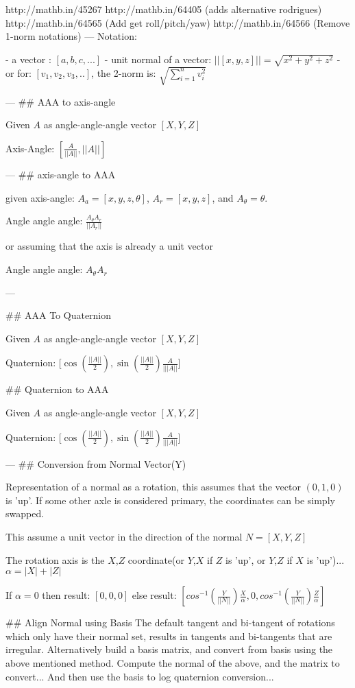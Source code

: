 http://mathb.in/45267
http://mathb.in/64405 (adds alternative rodrigues)
http://mathb.in/64565 (Add get roll/pitch/yaw)
http://mathb.in/64566 (Remove 1-norm notations)
---
Notation:
 
 - a vector : $[a,b,c,...]$
 - unit normal of a vector: $ ||[x,y,z]|| = \sqrt { x^2+y^2+z^2 } $
   - or for: $ [v_1,v_2,v_3,..] $, the 2-norm is: $ \sqrt { \sum_{i=1}^n v_i^2 } $

---
## AAA to axis-angle

Given $A$ as angle-angle-angle vector $[{X},{Y} ,{Z}] $ 

Axis-Angle: $ [ \frac {A} {||A||}, ||{A}|| ] $

---
## axis-angle to AAA

given axis-angle:
$ A_a =[ {x},{y},{z},{{\theta}}]  $, $A_r=[x,y,z]$, and $A_\theta = \theta$.

Angle angle angle: $   \frac  {{A_\theta}A_r} {||A_r||} $

or assuming that the axis is already a unit vector

Angle angle angle: $   {{A_\theta}A_r}$

---


## AAA To Quaternion

Given $A$ as angle-angle-angle vector $[{X},{Y} ,{Z}]$

Quaternion: [$\cos(\frac {||A||} {2} ),  \sin ( \frac {||A||} {2} ) \frac A {|||A||} $]


## Quaternion to AAA

Given $A$ as angle-angle-angle vector $[{X},{Y} ,{Z}]$

Quaternion: [$\cos(\frac {||A||} {2} ),  \sin ( \frac {||A||} {2} ) \frac A {|||A||} $]


---
## Conversion from Normal Vector(Y)

Representation of a normal as a rotation, this assumes that the vector $(0,1,0)$ is 'up'.  If some other axle is considered primary, the coordinates can be simply swapped.

This assume a unit vector in the direction of the normal
$N = [ X, Y, Z ]$


The rotation axis is the $X$,$Z$ coordinate(or $Y$,$X$ if $Z$ is 'up', or $Y$,$Z$ if $X$ is 'up')...
$   \alpha = |X| + |Z|$

If $\alpha = 0$ then result: $[0,0,0]$
else result: $ [      cos^{-1}( \frac {Y} {||N||} ) \frac X \alpha, 	0, cos^{-1}( \frac Y {||N||}) \frac Z \alpha ] $

## Align Normal using Basis
The default tangent and bi-tangent of rotations which only have their normal set, results in tangents and bi-tangents that are irregular.  Alternatively build a basis matrix, and convert from basis using the above mentioned method. 
Compute the normal of the above, and the matrix to convert...
And then use the basis to log quaternion conversion...

